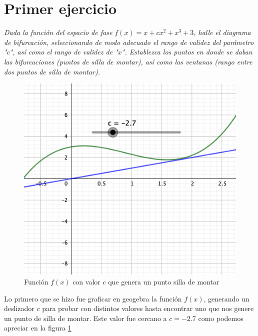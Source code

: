\documentclass[11pt]{report}
\theoremstyle{plain}
\theoremstyle{definition}
\begin{document}

\tableofcontents

\section{Primer ejercicio}
\textit{Dada la función del espacio de fase $f(x) = x+cx^2+x^3+3$, halle el diagrama de bifurcación, seleccionando de modo adecuado el rango de validez del parámetro "$c$", así como el rango de validez de "$x$". Establezca los puntos en donde se daban las bifurcaciones (puntos de silla de montar), así como las ventanas (rango entre dos puntos de silla de montar).}\\

\begin{figure}[!h] %
	\centering
	\includegraphics[scale=0.3]{caos_1_1.png}
	\caption{Función $f(x)$ con valor $c$ que genera un punto silla de montar}
	\label{fig:Eje1_1}
\end{figure}

Lo primero que se hizo fue graficar en geogebra la función $f(x)$, generando un deslizador $c$ para probar con distintos valores hasta encontrar uno que nos genere un punto de silla de montar. Este valor fue cercano a $c=-2.7$ como podemos apreciar en la figura \ref{fig:Eje1_1}
\end{document}

